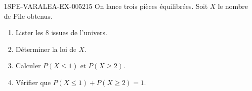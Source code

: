 \begin{exercice}{1SPE-VARALEA-EX-005}{2}{15}
On lance trois pièces équilibrées. Soit $X$ le nombre de Pile obtenus.

\begin{enumerate}
  \item Lister les $8$ issues de l'univers.
  \item Déterminer la loi de $X$.
  \item Calculer $P(X \leq 1)$ et $P(X \geq 2)$.
  \item Vérifier que $P(X \leq 1) + P(X \geq 2) = 1$.
\end{enumerate}
\end{exercice}
